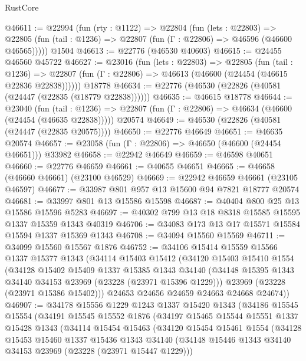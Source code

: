 \begin{lexlean}{RustCore}
\begin{coremodule}
@46611 := @22994
    (fun (rty : @1122) =>
    @22804
      (fun (lets : @22803) =>
      @22805 (fun (tail : @1236) => @22807 (fun (Γ : @22806) => @46596 (@46600 @46565)))))
    @1504
@46613 := @22776 (@46530 @40603)
@46615 := @24455 @46560 @45722
@46627 := @23016
    (fun (lets : @22803) =>
    @22805
      (fun (tail : @1236) =>
      @22807 (fun (Γ : @22806) => @46613 (@46600 (@24454 (@46615 @22836 @22838))))))
    @18778
@46634 := @22776 (@46530 (@22826 (@40581 (@24447 (@22835 (@18779 @22838))))))
@46635 := @46615 @18778
@46644 := @23040
    (fun (tail : @1236) => @22807 (fun (Γ : @22806) => @46634 (@46600 (@24454 (@46635 @22838)))))
    @20574
@46649 := @46530 (@22826 (@40581 (@24447 (@22835 @20575))))
@46650 := @22776 @46649
@46651 := @46635 @20574
@46657 := @23058 (fun (Γ : @22806) => @46650 (@46600 (@24454 @46651))) @33982
@46658 := @22942 @46649
@46659 := @46598 @40651
@46660 := @22776 @46659
@46661 := @40655 @46651
@46665 := @46658 (@46660 @46661) (@23100 @46529)
@46669 := @22942 @46659 @46661 (@23105 @46597)
@46677 := @33987 @801 @957 @13 @15600 @94 @7821 @18777 @20574
@46681 := @33997 @801 @13 @15586 @15598
@46687 := @40404 @800 @25 @13 @15586 @15596 @5283
@46697 := @40302 @799 @13 @18 @8318 @15585 @15595 @1337 @15359 @1343 @40319
@46706 := @34083 @173 @13 @17 @15571 @15584 @15594 @1337 @15369 @1343
@46708 := @34094 @15560 @15569
@46711 := @34099 @15560 @15567 @1876
@46752 := @34106
    @15414
    @15559
    @15566
    @1337
    @15377
    @1343
    (@34114
      @15403
      @15412
      (@34120
        @15403
        @15410
        @1554
        (@34128
          @15402
          @15409
          @1337
          @15385
          @1343
          @34140
          (@34148 @15395 @1343 @34140 @34153 @23969 (@23228 (@23971 @15396 @1229)))
          @23969
          (@23228 (@23971 @15386 @15402)))
        @24653
        @24656
        @24659
        @24663
        @24668
        @24674))
@46907 := @34178
    @15556
    @1229
    @1243
    @1337
    @15420
    @1343
    (@34186
      @15545
      @15554
      (@34191
        @15545
        @15552
        @1876
        (@34197
          @15465
          @15544
          @15551
          @1337
          @15428
          @1343
          (@34114
            @15454
            @15463
            (@34120
              @15454
              @15461
              @1554
              (@34128
                @15453
                @15460
                @1337
                @15436
                @1343
                @34140
                (@34148 @15446 @1343 @34140 @34153 @23969 (@23228 (@23971 @15447 @1229)))

\end{coremodule}
\end{lexlean}
